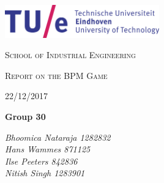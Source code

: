 \documentclass[a4paper]{article} %
\begin{document}
\begin{titlepage}

\centering
\vspace{5cm}
\includegraphics[width=0.5\textwidth]{tuelogo}\\
{\scshape\Large School of Industrial Engineering \par}

\vspace{5cm}

	{\scshape\LARGE Report on the BPM Game\par}
	22/12/2017
	\vspace{1.5cm}
	\vfill
	{\huge\bfseries Group 30\par}
	\vspace{2cm}
	{\Large\itshape Bhoomica Nataraja	1282832\\
Hans Wammes	871125\\
Ilse Peeters	842836\\
Nitish Singh	1283901\\
     \par}
     \vfill
     
     
\end{titlepage}
\doublespacing
\tableofcontents
\singlespacing
\newpage
\end{document}
